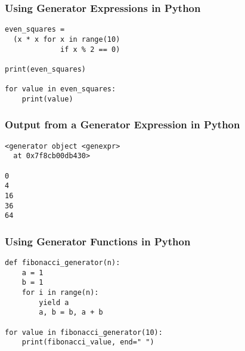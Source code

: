 \documentclass[14pt,aspectratio=169]{beamer}
\begin{document}
%
\begin{frame}[fragile]
  \frametitle{Using Generator Expressions in Python}
  \normalsize
  \begin{minipage}{6in}
    \vspace*{.2in}
    \begin{verbatim}
even_squares =
  (x * x for x in range(10)
             if x % 2 == 0)

print(even_squares)

for value in even_squares:
    print(value)
    \end{verbatim}
  \end{minipage}
\end{frame}

%
\begin{frame}[fragile]
  \frametitle{Output from a Generator Expression in Python}
  \normalsize
  \hspace*{.1in}
  \begin{minipage}{6in}
    \vspace*{.2in}
    \begin{verbatim}
<generator object <genexpr>
  at 0x7f8cb00db430>

0
4
16
36
64
    \end{verbatim}
  \end{minipage}
\end{frame}

%
\begin{frame}[fragile]
  \frametitle{Using Generator Functions in Python}
  \normalsize
  \begin{minipage}{6in}
    \vspace*{.1in}
    \begin{verbatim}
def fibonacci_generator(n):
    a = 1
    b = 1
    for i in range(n):
        yield a
        a, b = b, a + b

for value in fibonacci_generator(10):
    print(fibonacci_value, end=" ")
    \end{verbatim}
  \end{minipage}
\end{frame}
\end{document}
